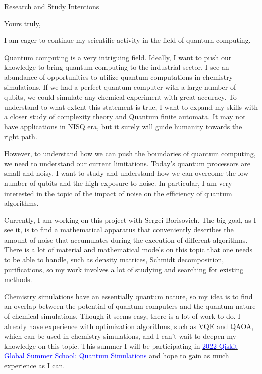 \documentclass[11pt,a4paper,sans]{moderncv}        %
\begin{document}
	\clearpage
	\date{June 05, 2022}
	\opening{Research and Study Intentions}
	\closing{Yours truly,}
	\makelettertitle
	
	I am eager to continue my scientific activity in the field of quantum computing. 
	
	Quantum computing is a very intriguing field. Ideally, I want to push our knowledge to bring quantum computing to the industrial sector. I see an abundance of opportunities to utilize quantum computations in chemistry simulations. If we had a perfect quantum computer with a large number of qubits, we could simulate any chemical experiment with great accuracy. To understand to what extent this statement is true, I want to expand my skills with a closer study of complexity theory and Quantum finite automata. It may not have applications in NISQ era, but it surely will guide humanity towards the right path.
	
	However, to understand how we can push the boundaries of quantum computing, we need to understand our current limitations. Today's quantum processors are small and noisy. I want to study and understand how we can overcome the low number of qubits and the high exposure to noise. In particular, I am very interested in the topic of the impact of noise on the efficiency of quantum algorithms.
	
	Currently, I am working on this project with Sergei Borisovich. The big goal, as I see it, is to find a mathematical apparatus that conveniently describes the amount of noise that accumulates during the execution of different algorithms. There is a lot of material and mathematical models on this topic that one needs to be able to handle, such as density matrices, Schmidt decomposition, purifications, so my work involves a lot of studying and searching for existing methods.
	
	Chemistry simulations have an essentially quantum nature, so my idea is to find an overlap between the potential of quantum computers and the quantum nature of chemical simulations. Though it seems easy, there is a lot of work to do. I already have experience with optimization algorithms, such as VQE and QAOA, which can be used in chemistry simulations, and I can't wait to deepen my knowledge on this topic. This summer I will be participating in \href{https://qiskit.org/events/summer-school/}{\textcolor{blue}{2022 Qiskit Global Summer School: Quantum Simulations}} and hope to gain as much experience as I can. 
	
\end{document}
